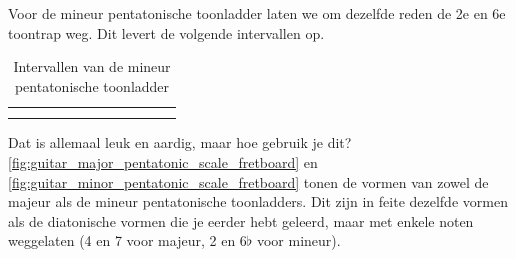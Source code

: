 Voor de mineur pentatonische toonladder laten we om dezelfde reden de 2e en 6e toontrap weg. Dit levert de volgende intervallen op.

\begin{table}[h]
	\centering
	\begin{NiceTabular}{*{12}{P{0.05mm}}}
		\Block{}{} &  & &  & &  & &  & &  & & \Block{}{} \\
		 & &  & &  & &  & &  & &  & 
	\end{NiceTabular}
	\caption{Intervallen van de mineur pentatonische toonladder}
	\label{tab:guitar_minor_pentatic_scale}
\end{table}

Dat is allemaal leuk en aardig, maar hoe gebruik je dit? \autoref{fig:guitar_major_pentatonic_scale_fretboard} en \autoref{fig:guitar_minor_pentatonic_scale_fretboard} tonen de vormen van zowel de majeur als de mineur pentatonische toonladders. Dit zijn in feite dezelfde vormen als de diatonische vormen die je eerder hebt geleerd, maar met enkele noten weggelaten (4 en 7 voor majeur, 2 en 6$\flat$ voor mineur).

\newpage

